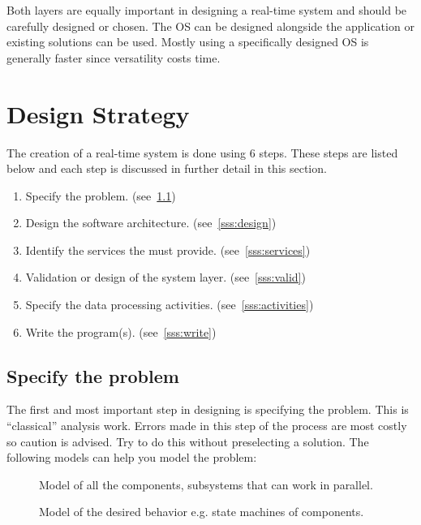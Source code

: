 Both layers are equally important in designing a real-time system and should be carefully designed or chosen.
The OS can be designed alongside the application or existing solutions can be used. 
Mostly using a specifically designed OS is generally faster since versatility costs time.

\section{Design Strategy}
The creation of a real-time system is done using 6 steps.
These steps are listed below and each step is discussed in further detail in this section. 
\begin{enumerate}
	\item Specify the problem. (see~\ref{sss:specify_problem})
	\item Design the software architecture. (see~\ref{sss:design})
	\item Identify the services the  must provide. (see~\ref{sss:services})
	\item Validation or design of the system layer. (see~\ref{sss:valid})
	\item Specify the data processing activities. (see~\ref{sss:activities})
	\item Write the program(s). (see~\ref{sss:write})
\end{enumerate}

\subsection{Specify the problem}
\label{sss:specify_problem}
The first and most important step in designing is specifying the problem. This is ``classical'' analysis work.
Errors made in this step of the process are most costly so caution is advised. 
Try to do this without preselecting a solution. The following models can help you model the problem:
\begin{description}
	\item[] Model of all the components, subsystems that can work in parallel.
	\item[] Model of the desired behavior e.g. state machines of components. 
\end{description}

